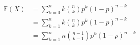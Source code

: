 \documentclass[preview]{standalone}
\begin{document}
\begin{align*}
\mathbb{E} (X) &= \sum ^{n} _{k=0} k {n\choose{k}} p^{k} (1-p)^{n-k}\\ &= \sum ^{n} _{k=1} k {n\choose{k}} p^{k} (1-p)^{n-k}\\ &= \sum ^{n} _{k=1} n {{n-1}\choose{k-1}} p^{k} (1-p)^{n-k}\\
\end{align*}
\end{document}
